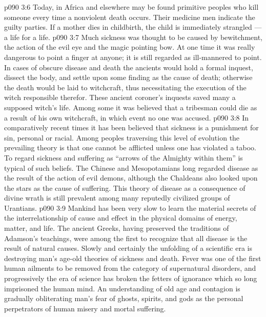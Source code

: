 \vs p090 3:6 Today, in Africa and elsewhere may be found primitive peoples who kill someone every time a nonviolent death occurs. Their medicine men indicate the guilty parties. If a mother dies in childbirth, the child is immediately strangled --- a life for a life.
\vs p090 3:7 \bibnobreakspace {} Much sickness was thought to be caused by bewitchment, the action of the evil eye and the magic pointing bow. At one time it was really dangerous to point a finger at anyone; it is still regarded as ill\hyp{}mannered to point. In cases of obscure disease and death the ancients would hold a formal inquest, dissect the body, and settle upon some finding as the cause of death; otherwise the death would be laid to witchcraft, thus necessitating the execution of the witch responsible therefor. These ancient coroner’s inquests saved many a supposed witch’s life. Among some it was believed that a tribesman could die as a result of his own witchcraft, in which event no one was accused.
\vs p090 3:8 \bibnobreakspace {} In comparatively recent times it has been believed that sickness is a punishment for sin, personal or racial. Among peoples traversing this level of evolution the prevailing theory is that one cannot be afflicted unless one has violated a taboo. To regard sickness and suffering as “arrows of the Almighty within them” is typical of such beliefs. The Chinese and Mesopotamians long regarded disease as the result of the action of evil demons, although the Chaldeans also looked upon the stars as the cause of suffering. This theory of disease as a consequence of divine wrath is still prevalent among many reputedly civilized groups of Urantians.
\vs p090 3:9 \bibnobreakspace {} Mankind has been very slow to learn the material secrets of the interrelationship of cause and effect in the physical domains of energy, matter, and life. The ancient Greeks, having preserved the traditions of Adamson’s teachings, were among the first to recognize that all disease is the result of natural causes. Slowly and certainly the unfolding of a scientific era is destroying man’s age\hyp{}old theories of sickness and death. Fever was one of the first human ailments to be removed from the category of supernatural disorders, and progressively the era of science has broken the fetters of ignorance which so long imprisoned the human mind. An understanding of old age and contagion is gradually obliterating man’s fear of ghosts, spirits, and gods as the personal perpetrators of human misery and mortal suffering.
